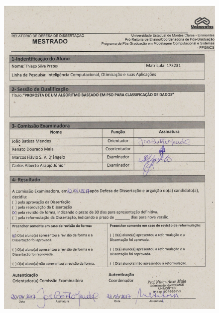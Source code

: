 \documentclass[
	12pt,				%
	openany,			%
	oneside,	
	a4paper,			%
	brazil,				%
	]{unimontes-ppgmsc-abntex2}
\begin{document}
\frenchspacing 

\pretextual

\let\cleardoublepage\clearpage
\imprimircapa

\let\cleardoublepage\clearpage
\thispagestyle{empty}
\imprimirfolhaderosto

\begin{figure}
  \begin{center}
   \includegraphics[width=\textwidth]{ata}
  \end{center}
\end{figure}
\end{document}
